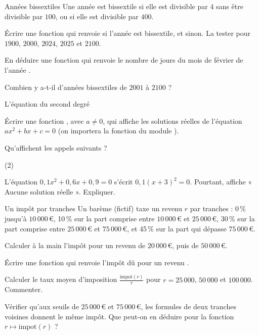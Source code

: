 \begin{exercice}[2]{Années bissextiles}
Une année est bissextile si elle est divisible par $4$ sans être divisible par $100$, ou si elle est divisible par $400$.
\begin{questions}
  \item Écrire une fonction  qui renvoie  si l'année  est bissextile, et  sinon.
    La tester pour $1900$, $2000$, $2024$, $2025$ et $2100$.
  \item En déduire une fonction  qui renvoie le nombre de jours du mois de février de l'année .
  \item Combien y a-t-il d'années bissextiles de $2001$ à $2100$ ?
\end{questions}
\end{exercice}

\begin{exercice}[2]{L'équation du second degré}
\begin{questions}
  \item Écrire une fonction , avec $a\neq0$, qui affiche les solutions réelles de l'équation $ax^{2}+bx+c=0$
    (on importera la fonction  du module ).
  \item Qu'affichent les appels suivants ?
\begin{tasks}[label=\alph*)](2)
  \task {}
  \task {}
  \task {}
  \task {}
\end{tasks}
  \item L'équation $0{,}1x^{2}+0{,}6x+0{,}9=0$ s'écrit $0{,}1(x+3)^{2}=0$. Pourtant,  affiche « Aucune
    solution réelle ». Expliquer.
\end{questions}
\end{exercice}

\begin{exercice}[3]{Un impôt par tranches}
Un barème (fictif) taxe un revenu $r$ par tranches : 0\,\% jusqu'à $10\,000$\,€, 10\,\% sur la part comprise entre $10\,000$\,€ et
$25\,000$\,€, 30\,\% sur la part comprise entre $25\,000$\,€ et $75\,000$\,€, et 45\,\% sur la part qui dépasse $75\,000$\,€.
\begin{questions}
  \item Calculer à la main l'impôt pour un revenu de $20\,000$\,€, puis de $50\,000$\,€.
  \item Écrire une fonction  qui renvoie l'impôt dû pour un revenu .
  \item Calculer le taux moyen d'imposition $\frac{\text{impot}(r)}{r}$ pour $r=25\,000$, $50\,000$ et $100\,000$. Commenter.
  \item Vérifier qu'aux seuils de $25\,000$\,€ et $75\,000$\,€, les formules de deux tranches voisines donnent le même impôt.
    Que peut-on en déduire pour la fonction $r\mapsto\text{impot}(r)$ ?
\end{questions}
\end{exercice}

